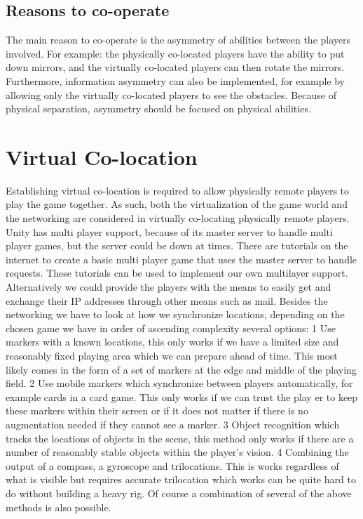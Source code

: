		\subsection{Reasons to co-operate}
			The main reason to co-operate is the asymmetry of abilities between
			the players involved. For example: the physically co-located players
			have the ability to put down mirrors, and the virtually co-located
			players can then rotate the mirrors. Furthermore, information
			asymmetry can also be implemented, for example by allowing only the
			virtually co-located players to see the obstacles. Because of physical
			separation, asymmetry should be focused on physical abilities.
		
	\section{Virtual Co-location} \label{sec:virtualcolocation}
		Establishing virtual co-location is required to allow physically remote players
		to play the game together. As such, both the virtualization of the game world and
		the networking are considered in virtually co-locating physically remote players.
		Unity has multi player support, because of its master server to handle multi player
		games, but the server could be down at times. There are tutorials on the internet
		to create a basic multi player game that uses the master server to handle requests.
		These tutorials can be used to implement our own multilayer support. Alternatively
		we could provide the players with the means to easily get and exchange their IP
		addresses through other means such as mail. 
		Besides the networking we have to look at how we synchronize locations, depending on
		the chosen game we have in order of ascending complexity several options:
		1 Use markers with a known locations, this only works if we have a limited size 
		and reasonably fixed playing area which we can prepare ahead of time. This most 
		likely comes in the form of a set of markers at the edge and middle of the playing 
		field. 
		2 Use mobile markers which synchronize between players automatically, for example
		cards in a card game. This only works if we can trust the play er to keep these markers
		within their screen or if it does not matter if there is no augmentation needed if they
		cannot see a marker. 
		3 Object recognition which tracks the locations of objects in the scene,
		this method only works if there are a number of reasonably stable objects 
		within the player's vision. 
		4 Combining the output of a compass, a gyroscope and trilocations. This is 
		works regardless of what is visible but requires accurate trilocation which works
		can be quite hard to do without building a heavy rig. 
		Of course a combination of several of the above methods is also possible. 

